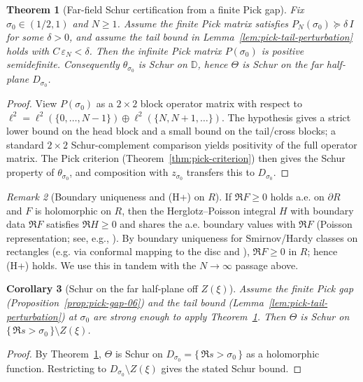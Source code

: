 \documentclass[11pt]{article}
\newtheorem{theorem}{Theorem}
\newtheorem{corollary}[theorem]{Corollary}
\theoremstyle{definition}
\theoremstyle{remark}
\newtheorem{remark}[theorem]{Remark}
\theoremstyle{definition}
\begin{document}
\begin{theorem}[Far-field Schur certification from a finite Pick gap]\label{thm:pick-global-positivity}
Fix $\sigma_0\in(1/2,1)$ and $N\ge 1$.
Assume the finite Pick matrix satisfies $P_N(\sigma_0)\succeq \delta\,I$ for some $\delta>0$, and assume the tail bound in Lemma~\ref{lem:pick-tail-perturbation} holds with $C\,\varepsilon_N<\delta$.
Then the infinite Pick matrix $P(\sigma_0)$ is positive semidefinite. Consequently $\theta_{\sigma_0}$ is Schur on $\mathbb D$, hence $\Theta$ is Schur on the far half-plane $D_{\sigma_0}$.
\end{theorem}
\begin{proof}
View $P(\sigma_0)$ as a $2\times 2$ block operator matrix with respect to $\ell^2=\ell^2(\{0,\dots,N-1\})\oplus \ell^2(\{N,N+1,\dots\})$.
The hypothesis gives a strict lower bound on the head block and a small bound on the tail/cross blocks; a standard $2\times 2$ Schur-complement comparison yields positivity of the full operator matrix.
The Pick criterion (Theorem~\ref{thm:pick-criterion}) then gives the Schur property of $\theta_{\sigma_0}$, and composition with $z_{\sigma_0}$ transfers this to $D_{\sigma_0}$.
\end{proof}
\begin{remark}[Boundary uniqueness and (H+) on $R$]\label{rem:boundary-uniqueness}
If $\Re F\ge 0$ holds a.e. on $\partial R$ and $F$ is holomorphic on $R$, then the Herglotz–Poisson integral $H$ with boundary data $\Re F$ satisfies $\Re H\ge 0$ and shares the a.e. boundary values with $\Re F$ (Poisson representation; see, e.g., \cite[Ch.~II]{SteinHA}). By boundary uniqueness for Smirnov/Hardy classes on rectangles (e.g. via conformal mapping to the disc and \cite[Thm.~II.4.2]{Garnett}), $\Re F\ge 0$ in $R$; hence (H+) holds. We use this in tandem with the $N\to\infty$ passage above.
\end{remark}
\begin{corollary}[Schur on the far half-plane off \(Z(\xi)\)]\label{cor:Schur-off-zeros}
Assume the finite Pick gap (Proposition~\ref{prop:pick-gap-06}) and the tail bound (Lemma~\ref{lem:pick-tail-perturbation}) at $\sigma_0$ are strong enough to apply Theorem~\ref{thm:pick-global-positivity}.
Then \(\Theta\) is Schur on \(\{\,\Re s>\sigma_0\,\}\setminus Z(\xi)\).
\end{corollary}
\begin{proof}
By Theorem~\ref{thm:pick-global-positivity}, $\Theta$ is Schur on $D_{\sigma_0}=\{\,\Re s>\sigma_0\,\}$ as a holomorphic function. Restricting to $D_{\sigma_0}\setminus Z(\xi)$ gives the stated Schur bound.
\end{proof}
\end{document}
